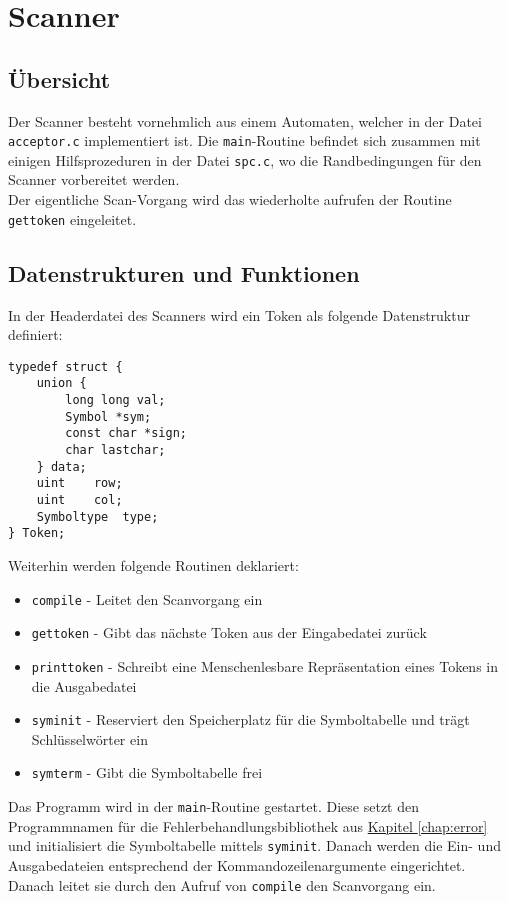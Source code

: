 \chapter{Scanner}
\label{chap:scanner}

\section{Übersicht}
\label{sec:scanner_overview}
Der Scanner besteht vornehmlich aus einem Automaten,
welcher in der Datei \texttt{acceptor.c} implementiert ist.
Die \texttt{main}-Routine befindet sich zusammen mit einigen Hilfsprozeduren in der Datei \texttt{spc.c},
wo die Randbedingungen für den Scanner vorbereitet werden. \\
Der eigentliche Scan-Vorgang wird das wiederholte aufrufen der Routine \texttt{gettoken} eingeleitet.

\section{Datenstrukturen und Funktionen}
\label{sec:scanner_datafunc}

In der Headerdatei des Scanners wird ein Token als folgende Datenstruktur definiert:

\begin{lstlisting}
typedef struct {
	union {
		long long val;
		Symbol *sym;
		const char *sign;
		char lastchar;
	} data;
	uint	row;
	uint	col;
	Symboltype	type;
} Token;
\end{lstlisting}

Weiterhin werden folgende Routinen deklariert:

\begin{itemize}
\item \texttt{compile} - Leitet den Scanvorgang ein
\item \texttt{gettoken} - Gibt das nächste Token aus der Eingabedatei zurück
\item \texttt{printtoken} - Schreibt eine Menschenlesbare Repräsentation eines Tokens in die Ausgabedatei
\item \texttt{syminit} - Reserviert den Speicherplatz für die Symboltabelle und trägt Schlüsselwörter ein
\item \texttt{symterm} - Gibt die Symboltabelle frei
\end{itemize}

Das Programm wird in der \texttt{main}-Routine gestartet.
Diese setzt den Programmnamen für die Fehlerbehandlungsbibliothek aus \hyperref[chap:error]{Kapitel \ref{chap:error}}
und initialisiert die Symboltabelle mittels \texttt{syminit}.
Danach werden die Ein- und Ausgabedateien entsprechend der Kommandozeilenargumente eingerichtet.
Danach leitet sie durch den Aufruf von \texttt{compile} den Scanvorgang ein.

